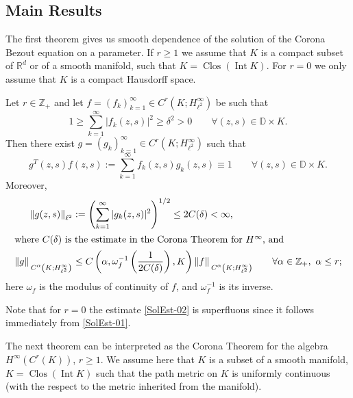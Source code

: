 \documentclass[12pt]{amsart}
\begin{document}
{\begin{list}{X}
{\subsection{Main Results}
The first theorem gives us smooth dependence of the solution of the Corona Bezout equation on a parameter.  
If $r\ge 1$ we assume that  $K$ is a compact subset of ${\mathbb{R}}^d$ or of a smooth manifold, such that $K={\operatorname{Clos}}\left({\operatorname{Int}} K\right)$. For $r=0$ we only assume that $K$ is a compact Hausdorff space. 
\begin{thm}
\label{t:main-01}
Let $r\in{\mathbb{Z}}_+$ and let $f=(f_k)_{k=1}^\infty\in C^r \left(K;H^\infty_{\ell^2}\right)$  be such that 
\[
1\ge \sum_{k=1}^\infty \left|f_k(z, s)\right|^2\ge\delta^2 >0\qquad \forall (z,s)\in {\mathbb{D}}\times K. 
\] 
Then there exist $g=(g_k)_{k=1}^\infty\in C^r\left(K;H^\infty_{\ell^2}\right)$ such that 
\[
g^T(z,s)f(z,s) := \sum_{k=1}^\infty f_k(z,s) g_k(z,s) \equiv 1\qquad \forall (z,s)\in {\mathbb{D}}\times K. 
\]
Moreover,
\begin{align}
\label{SolEst-01}
\left\|g(z, s)\right\|_{\ell^2}  & := \left(\sum_{k=1}^\infty |g_k(z, s)|^2 \right)^{1/2}  \le 2 C(\delta) <\infty,  \\
\intertext{where $C(\delta) $ is the estimate in the Corona Theorem for $H^\infty$, and}
\label{SolEst-02}
\left\|g\right\|{_{ {}_{\scriptstyle {C^{\alpha}\left(K;H^\infty_{\ell^2}\right)}}}} & \le C\left(\alpha, \omega_f^{-1}\left(\frac{1}{2C(\delta)}\right),  K\right) \left\|f\right\|{_{ {}_{\scriptstyle {C^{\alpha}\left(K;H^\infty_{\ell^2}\right)}}}} \qquad \forall \alpha\in{\mathbb{Z}}_+, \ \alpha \le r;
\end{align}
here $\omega_f$ is the modulus of continuity of $f$, and \(\omega_f^{-1}\) is its inverse. 
\end{thm}
Note that for $r=0$ the estimate \eqref{SolEst-02} is superfluous since it follows immediately from \eqref{SolEst-01}. 

The next theorem can be interpreted as the Corona Theorem for the algebra $H^\infty\left(C^r(K)\right)$, $r\ge 1$. We assume here that $K$ is a subset of a smooth manifold, $K={\operatorname{Clos}}\left({\operatorname{Int}} K\right)$ such that the path metric on $K$ is uniformly continuous (with the respect to the metric inherited from the manifold). 

}
\end{list}}
\end{document}
